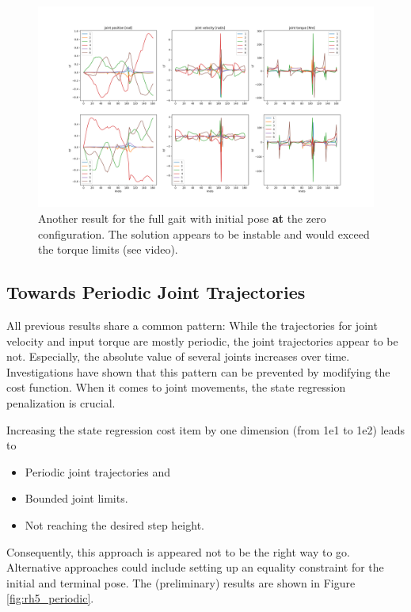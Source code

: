 \begin{figure}[h!]
\centering
\includegraphics[width=1\linewidth]{Media/Crocoddyl/RH5Legs/InitPoseVariants/RH5GaitInitZeroConfig_Solution_FailedSolver.png}
\caption{Another result for the full gait with initial pose \textbf{at} the zero configuration. The solution appears to be instable and would exceed the torque limits (see video).}
\label{fig:rh5_init_at_zero_failed_solver}
\end{figure}

\subsection{Towards Periodic Joint Trajectories}
All previous results share a common pattern: While the trajectories for joint velocity and input torque are mostly periodic, the joint trajectories appear to be not. Especially, the absolute value of several joints increases over time. Investigations have shown that this pattern can be prevented by modifying the cost function. When it comes to joint movements, the state regression penalization is crucial. 

Increasing the state regression cost item by one dimension (from 1e1 to 1e2) leads to
\begin{itemize}
\item Periodic joint trajectories and
\item Bounded joint limits.
\item Not reaching the desired step height. 
\end{itemize} 
Consequently, this approach is appeared not to be the right way to go. Alternative approaches could include setting up an equality constraint for the initial and terminal pose. 
The (preliminary) results are shown in Figure \ref{fig:rh5_periodic}.
   
